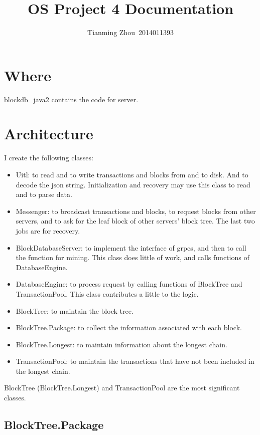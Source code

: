 \documentclass{article}
\title{OS Project 4 Documentation}
\author{Tianming Zhou\ 2014011393}
\begin{document}
\maketitle \thispagestyle{empty}

\section{Where}

blockdb\_java2 contains the code for server.

\section{Architecture}

I create the following classes:
\begin{itemize}
\item Uitl: to read and to write transactions and blocks from and to disk. And to decode the json string. Initialization and recovery may use this class to read and to parse data.
\item Messenger: to broadcast transactions and blocks, to request blocks from other servers, and to ask for the leaf block of other servers' block tree. The last two jobs are for recovery.
\item BlockDatabaseServer: to implement the interface of grpcs, and then to call the function for mining. This class does little of work, and calls functions of DatabaseEngine.
\item DatabaseEngine: to process request by calling functions of BlockTree and TransactionPool. This class contributes a little to the logic.
\item BlockTree: to maintain the block tree.
\item BlockTree.Package: to collect the information associated with each block.
\item BlockTree.Longest: to maintain information about the longest chain.
\item TransactionPool: to maintain the transactions that have not been included in the longest chain.
\end{itemize}

BlockTree (BlockTree.Longest) and TransactionPool are the most significant classes.

\subsection{BlockTree.Package}
\end{document}
